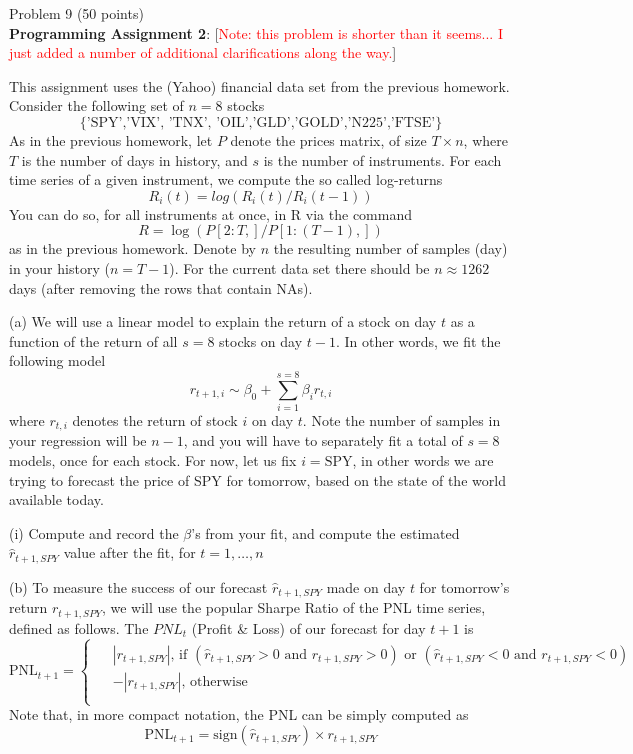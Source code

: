 \documentclass[12pt]{article}
\begin{document}
\vspace{6mm}

Problem 9  (50 points)\\
\textbf{Programming Assignment 2}: [\textcolor{red}{Note: this problem is shorter than it seems... I just added a number of additional clarifications along the way.}]

This assignment uses the (Yahoo) financial data set from the previous homework. Consider the following set of $n=8$ stocks
$$\{ \mbox{'SPY','\^{}VIX', '\^{}TNX', 'OIL','GLD','GOLD','\^{}N225','\^{}FTSE'} \}$$ 
As in the previous homework, let $P$ denote the prices matrix, of size $T \times n$, where $T$ is the number of days in history, and $s$ is the number of instruments.  For each time series of a given instrument, we compute the so called log-returns
	$$ R_i(t) = log( R_i(t)/R_i(t-1) ) $$
You can do so, for all instruments at once, in R via the command
$$R = \log( P[2:T, ] / P[1:(T-1),])$$
as in the previous homework. Denote by $n$ the resulting number of samples (day) in your history ($n=T-1$). For the current data set there should be $ n \approx 1262$ days (after removing the rows that contain NAs).

(a) We will use a linear model to explain the return of a stock on day $t$ as a function of the return of all $s=8$ stocks on day $t-1$. In other words, we fit the following model
$$ r_{t+1,i}  \sim \beta_0 + \sum_{i=1}^{s=8} \beta_i  r_{t,i} $$
where $r_{t,i}$ denotes the return of stock $i$ on day $t$. Note the number of samples in your regression will be $n-1$, and you will have to separately fit a total of $s=8$ models, once for each stock. For now, let us fix $i=\mbox{SPY}$, in other words we are trying to forecast the price of SPY for tomorrow, based on the state of the world available today.

  (i) Compute and record the $\beta$'s from your fit, and compute the estimated $\hat{r}_{t+1,SPY}$ value after the fit, for $t=1,\ldots,n$
  
(b) To measure the success of our forecast $\hat{r}_{t+1,SPY}$ made on day $t$ for  tomorrow's return $r_{t+1,SPY}$, we will use the popular Sharpe Ratio of the PNL time series, defined as follows. The $PNL_t$ (Profit \& Loss) of our forecast for day $t+1$ is
\[
\mbox{PNL}_{t+1} = 
\begin{cases}
 \begin{aligned}
  & |r_{t+1,SPY}| \mbox{, if } (\hat{r}_{t+1,SPY} > 0 \mbox{ and } r_{t+1,SPY} > 0) \mbox{ or } (\hat{r}_{t+1,SPY} < 0 \mbox{ and } r_{t+1,SPY} < 0)  \\
  & -|r_{t+1,SPY}|  \mbox{, otherwise }  \\
 \end{aligned}
\end{cases}
\]
Note that, in more compact notation, the PNL can be simply computed as 
\begin{equation}
 \mbox{PNL}_{t+1} = \mbox{sign}(\hat{r}_{t+1,SPY}) \times r_{t+1,SPY}
 \label{def:pnl}
\end{equation}
\end{document}
